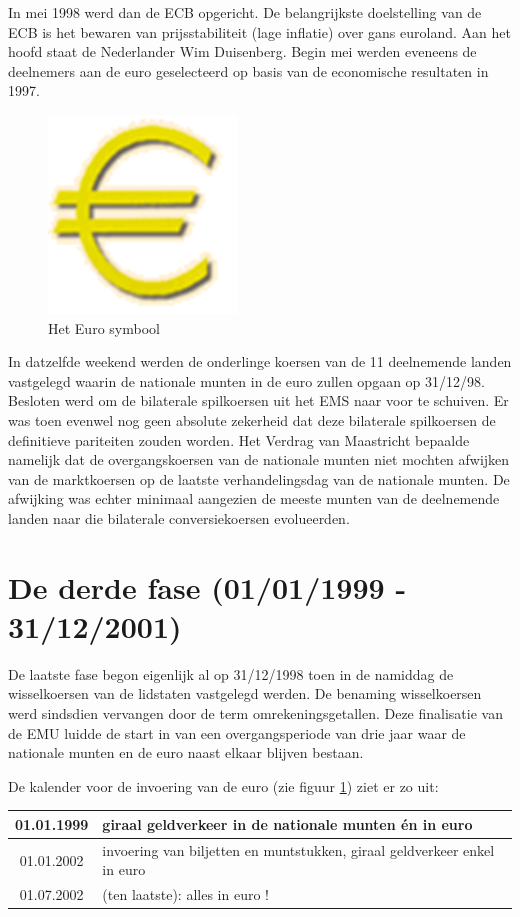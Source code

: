 In mei 1998 werd dan de ECB opgericht. De belangrijkste doelstelling
van de ECB is het bewaren van prijsstabiliteit (lage inflatie) over
gans euroland. Aan het hoofd staat de Nederlander Wim Duisenberg.
Begin mei werden eveneens de deelnemers aan de euro geselecteerd op
basis van de economische resultaten in 1997.
\begin{figure}[euro]
	\centerline{\includegraphics[width= 5cm]{euro.png}}
	\caption{Het Euro symbool}
	\label{euro}
\end{figure}

In datzelfde weekend werden de onderlinge koersen van de 11
deelnemende landen vastgelegd waarin de nationale munten in de euro
zullen opgaan op 31/12/98. Besloten werd om de bilaterale
spilkoersen uit het EMS naar voor te schuiven. Er was toen evenwel
nog geen absolute zekerheid dat deze bilaterale spilkoersen de
definitieve pariteiten zouden worden. Het Verdrag van Maastricht
bepaalde namelijk dat de overgangskoersen van de nationale munten
niet mochten afwijken van de marktkoersen op de laatste
verhandelingsdag van de nationale munten. De afwijking was echter
minimaal aangezien de meeste munten van de deelnemende landen naar
die bilaterale conversiekoersen evolueerden.

\section{De derde fase (01/01/1999 - 31/12/2001)}

De laatste fase begon eigenlijk al op 31/12/1998 toen in de namiddag
de wisselkoersen van de lidstaten vastgelegd werden. De benaming
wisselkoersen werd sindsdien vervangen door de term
omrekeningsgetallen. Deze finalisatie van de EMU luidde de start in
van een overgangsperiode van drie jaar waar de nationale munten en
de euro naast elkaar blijven bestaan.

De kalender voor de invoering van de euro (zie figuur \ref{euro}) ziet er zo uit:

\begin{center}
\begin{tabular}{| c | p{5cm} |}
	\hline
	01.01.1999 & giraal geldverkeer in de nationale munten \'en in euro \\ \hline

	01.01.2002 & invoering van biljetten en muntstukken, giraal geldverkeer
	enkel in euro \\ \hline

	01.07.2002 & (ten laatste): alles in euro ! \\
	\hline
\end{tabular}
\end{center}

